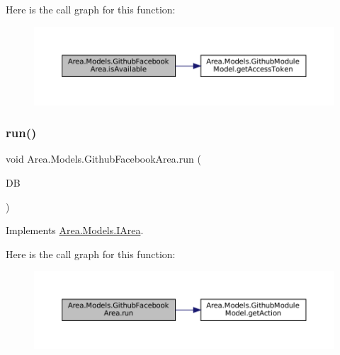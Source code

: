 Here is the call graph for this function\+:
\nopagebreak
\begin{figure}[H]
\begin{center}
\leavevmode
\includegraphics[width=350pt]{classArea_1_1Models_1_1GithubFacebookArea_ab1f22cb94018e33fa92221c812da1020_cgraph}
\end{center}
\end{figure}
\mbox{\label{classArea_1_1Models_1_1GithubFacebookArea_a984d46335dd21d81088312ebe413a0fc}} 
\subsubsection{\texorpdfstring{run()}{run()}}
{\footnotesize\ttfamily void Area.\+Models.\+Github\+Facebook\+Area.\+run (\begin{DoxyParamCaption}\item[{\mbox{\hyperlink{classArea_1_1DAT_1_1AreaDbContext}{Area\+Db\+Context}}}]{DB }\end{DoxyParamCaption})\hspace{0.3cm}{\ttfamily [inline]}}



Implements \mbox{\hyperlink{interfaceArea_1_1Models_1_1IArea_af153822d2715dad8eb1c250bcc4de567}{Area.\+Models.\+I\+Area}}.

Here is the call graph for this function\+:
\nopagebreak
\begin{figure}[H]
\begin{center}
\leavevmode
\includegraphics[width=350pt]{classArea_1_1Models_1_1GithubFacebookArea_a984d46335dd21d81088312ebe413a0fc_cgraph}
\end{center}
\end{figure}


